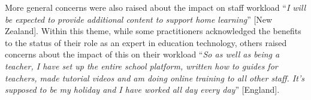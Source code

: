 \documentclass[conference]{IEEEtran}
\begin{document}
More general concerns were also raised about the impact on staff
workload ``{\emph{I will be expected to provide additional content to
support home learning}}'' [New Zealand]. Within this theme, while some
practitioners acknowledged the benefits to the status of their role as
an expert in education technology, others raised concerns about the
impact of this on their workload ``{\emph{So as well as being a
teacher, I have set up the entire school platform, written how to
guides for teachers, made tutorial videos and am doing online training
to all other staff. It's supposed to be my holiday and I have worked
all day every day}}'' [England].


\end{document}
